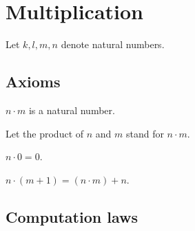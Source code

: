 \documentclass[../../natural-numbers.ftl.tex]{subfiles}
\begin{document}
  \section{Multiplication}

  \begin{forthel}
  \end{forthel}

  \begin{forthel}
    Let $k, l, m, n$ denote natural numbers.
  \end{forthel}


  \subsection{Axioms}

  \begin{forthel}
    \begin{signature}
      $n \cdot m$ is a natural number.
    \end{signature}

    Let the product of $n$ and $m$ stand for $n \cdot m$.

    \begin{axiom}\label{Arithmetic_01_03_374176}
      $n \cdot 0 = 0$.
    \end{axiom}

    \begin{axiom}\label{Arithmetic_01_03_667207}
      $n \cdot (m + 1) = (n \cdot m) + n$.
    \end{axiom}
  \end{forthel}


  \subsection{Computation laws}
\end{document}
